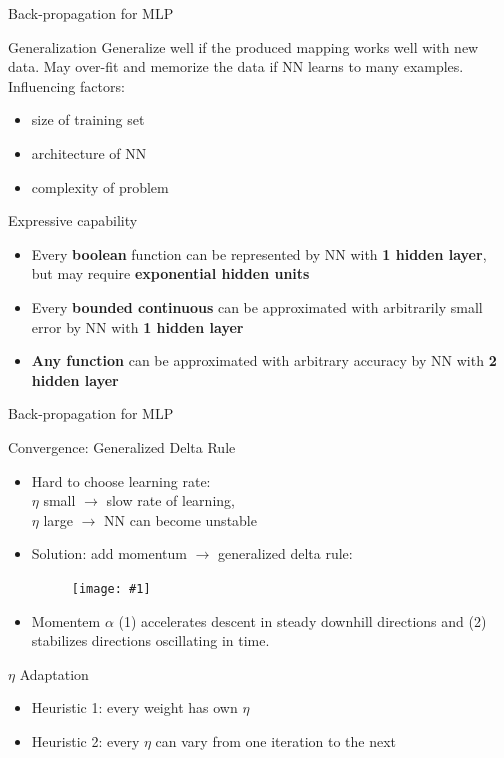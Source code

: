 \documentclass[9pt,t]{beamer}
\newcommand{\picEqHereWidth}[2] { %
    \begin{figure}[htp] 
        \centering
        \texttt{[image: \#1]}
    \end{figure}
}
\begin{document}
\begin{frame}{Back-propagation for MLP}
    \begin{alertblock}{Generalization}
        Generalize well if the produced mapping works well with new data. May over-fit and memorize the data if NN learns to many examples. Influencing factors:
        \begin{itemize}
            \item size of training set
            \item architecture of NN
            \item complexity of problem
        \end{itemize}
    \end{alertblock}
    \begin{alertblock}{Expressive capability}
        \begin{itemize}
            \item Every \textbf{boolean} function can be represented by NN with \textbf{1 hidden layer}, but may require \textbf{exponential hidden units}
            \item Every \textbf{bounded continuous} can be approximated with arbitrarily small error by NN with \textbf{1 hidden layer}
            \item \textbf{Any function} can be approximated with arbitrary accuracy by NN with \textbf{2 hidden layer}
        \end{itemize}
    \end{alertblock}
\end{frame}

\begin{frame}{Back-propagation for MLP}
    \begin{alertblock}{Convergence: Generalized Delta Rule}
        \begin{itemize}
            \item Hard to choose learning rate:\\
                $ \eta $ small $ \rightarrow $ slow rate of learning,\\
                $ \eta $ large $ \rightarrow $ NN can become unstable
            \item Solution: add momentum $ \rightarrow $ generalized delta rule:
                \picEqHereWidth{mlp_generalized_delta}{0.5\linewidth}
            \item Momentem $ \alpha $ (1) accelerates descent in steady downhill directions and (2) stabilizes directions oscillating in time.
        \end{itemize}
    \end{alertblock}
    \begin{alertblock}{$ \eta $ Adaptation}
        \begin{itemize}
            \item Heuristic 1: every weight has own $ \eta $
            \item Heuristic 2: every $ \eta $ can vary from one iteration to the next
        \end{itemize}
    \end{alertblock}
\end{frame}

\end{document}
